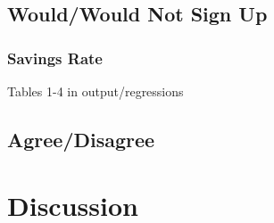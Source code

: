 \documentclass[
]{article}
\begin{document}
\hypertarget{wouldwould-not-sign-up}{%
\subsection{Would/Would Not Sign Up}\label{wouldwould-not-sign-up}}

\hypertarget{savings-rate}{%
\subsubsection{Savings Rate}\label{savings-rate}}

Tables 1-4 in output/regressions

\hypertarget{agreedisagree}{%
\subsection{Agree/Disagree}\label{agreedisagree}}

\hypertarget{discussion}{%
\section{Discussion}\label{discussion}}
\end{document}
